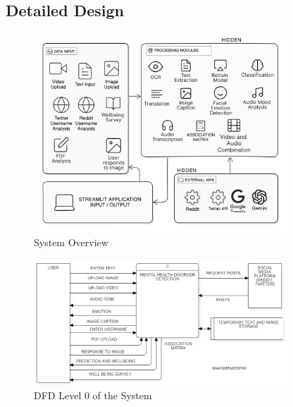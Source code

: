 \subsection{Detailed Design}
\begin{figure}[h!]  
    \centering
    \includegraphics[width=0.85\textwidth]{Images/System Overview.png}  
    \caption{System Overview}
    \label{System Overview}  %
\end{figure}

\begin{figure}[h!]  
    \centering
    \includegraphics[width=0.85\textwidth]{Images/DFD L0.png}  
    \caption{DFD Level 0 of the System}
    \label{dfdl0123}  %
\end{figure}

\pagebreak

